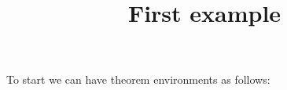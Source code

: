 \documentclass{ximera}
\title{First example}
\begin{document}
\maketitle

To start we can have theorem environments as follows:
\end{document}
